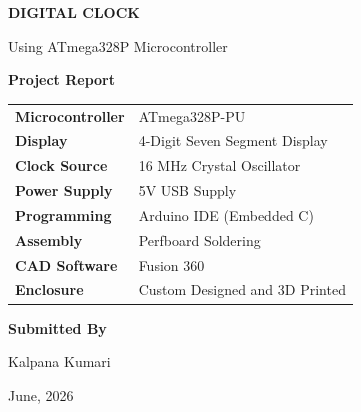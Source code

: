 \documentclass[12pt,a4paper]{article}
\begin{document}

\begin{titlepage}


\centering

\vspace*{1.8cm}

{\Huge\bfseries DIGITAL CLOCK\\[0.4cm]}

{\Large Using ATmega328P Microcontroller}

\vspace{1.5cm}

{\Large\bfseries Project Report}

\vspace{1.8cm}

\begin{tabular}{ll}
\textbf{Microcontroller} & ATmega328P-PU\\
\textbf{Display} & 4-Digit Seven Segment Display\\
\textbf{Clock Source} & 16 MHz Crystal Oscillator\\
\textbf{Power Supply} & 5V USB Supply\\
\textbf{Programming} & Arduino IDE (Embedded C)\\
\textbf{Assembly} & Perfboard Soldering\\
\textbf{CAD Software} & Fusion 360\\
\textbf{Enclosure} & Custom Designed and 3D Printed\\
\end{tabular}

\vfill

\textbf{\Large Submitted By}

\vspace{0.4cm}

Kalpana Kumari

June, 2026

\end{titlepage}


\tableofcontents
\end{document}
